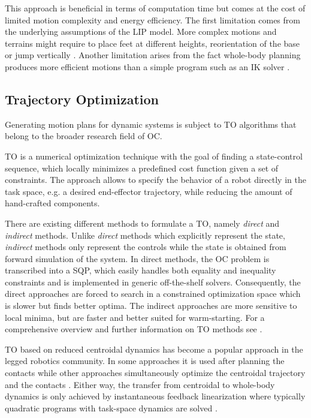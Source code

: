 This approach is beneficial in terms of computation time but comes at the cost of limited motion complexity and energy efficiency. 
The first limitation comes from the underlying assumptions of the \gls{LIP} model. More complex motions and terrains might require to place feet at different heights, reorientation of the base or jump vertically \cite{winkler2018optimization}. Another limitation arises from the fact whole-body planning produces more efficient motions than a simple program such as an \gls{IK} solver \cite{budhiraja2018differential}.   

\subsection{Trajectory Optimization}
Generating motion plans for dynamic systems is subject to \gls{TO} algorithms that belong to the broader research field of \gls{OC}. 

\gls{TO} is a numerical optimization technique with the goal of finding a state-control sequence, which locally minimizes a predefined cost function given a set of constraints. The approach allows to specify the behavior of a robot directly in the task space, e.g. a desired end-effector trajectory, while reducing the amount of hand-crafted components. 

There are existing different methods to formulate a \gls{TO}, namely \textit{direct} and \textit{indirect} methods. Unlike \textit{direct} methods which explicitly represent the state, \textit{indirect} methods only represent the controls while the state is obtained from forward simulation of the system. In direct methods, the \gls{OC} problem is transcribed into a \gls{SQP}, which easily handles both equality and inequality constraints and is implemented in generic off-the-shelf solvers. Consequently, the direct approaches are forced to search in a constrained optimization space which is slower but finds better optima. The indirect approaches are more sensitive to local minima, but are faster and better suited for warm-starting. For a comprehensive overview and further information on \gls{TO} methods see \cite{betts1998survey, kelly2017transcription, tassa2014control}.

\gls{TO} based on reduced centroidal dynamics \cite{orin2013centroidal} has become a popular approach in the legged robotics community. In some approaches it is used after planning the contacts \cite{dai2014whole, carpentier2016versatile, herzog2015trajectory} while other approaches simultaneously optimize the centroidal trajectory and the contacts \cite{mastalli2017trajectory, winkler2018gait, aceituno2017simultaneous}. Either way, the transfer from centroidal to whole-body dynamics is only achieved by instantaneous feedback linearization where typically quadratic programs with task-space dynamics are solved \cite{saab2013dynamic, herzog2016momentum, vaillant2016multi}. 

